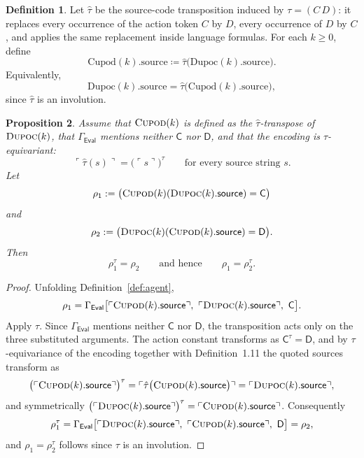 \documentclass[11pt]{article}
\theoremstyle{definition}
\newtheorem{definition}{Definition}[section]
\theoremstyle{plain}
\newtheorem{proposition}[definition]{Proposition}
\theoremstyle{remark}
\begin{document}
\newpage

\begin{definition}\label{def:transposed-agents}
Let \(\widehat{\tau}\) be the source-code transposition induced by
\(\tau=(C\,D)\): it replaces every occurrence of the action token \(C\)
by \(D\), every occurrence of \(D\) by \(C\), and applies the same
replacement inside language formulas. For each \(k\geq 0\), define
\[
\mathrm{Cupod}(k).\mathrm{source}
\coloneq
\widehat{\tau}\bigl(\mathrm{Dupoc}(k).\mathrm{source}\bigr).
\]
Equivalently,
\[
\mathrm{Dupoc}(k).\mathrm{source}
=
\widehat{\tau}\bigl(\mathrm{Cupod}(k).\mathrm{source}\bigr),
\]
since \(\widehat{\tau}\) is an involution.
\end{definition}




\begin{proposition}\label{label}
Assume that $\textsc{Cupod}(k)$ is defined as the $\hat{\tau}$-transpose of
$\textsc{Dupoc}(k)$, that $\Gamma_{\mathsf{Eval}}$ mentions neither $\mathsf{C}$ nor
$\mathsf{D}$, and that the encoding is $\tau$-equivariant:
\[
\ulcorner\hat{\tau}(s)\urcorner = \bigl(\ulcorner s\urcorner\bigr)^{\tau}
\qquad\text{for every source string } s.
\]
Let
\[
\rho_1 := \bigl(\textsc{Cupod}(k)(\textsc{Dupoc}(k).\mathsf{source}) = \mathsf{C}\bigr)
\]
and
\[
\rho_2 := \bigl(\textsc{Dupoc}(k)(\textsc{Cupod}(k).\mathsf{source}) = \mathsf{D}\bigr).
\]
Then
\[
\rho_1^{\tau} = \rho_2 \qquad\text{and hence}\qquad \rho_1 = \rho_2^{\tau}.
\]
\end{proposition}









\begin{proof}
Unfolding Definition~\ref{def:agent},
\[
\rho_1 = \Gamma_{\mathsf{Eval}}\bigl[\ulcorner\textsc{Cupod}(k).\mathsf{source}\urcorner,\
\ulcorner\textsc{Dupoc}(k).\mathsf{source}\urcorner,\ \mathsf{C}\bigr].
\]
Apply $\tau$. Since $\Gamma_{\mathsf{Eval}}$ mentions neither $\mathsf{C}$ nor $\mathsf{D}$,
the transposition acts only on the three substituted arguments. The action constant
transforms as $\mathsf{C}^{\tau}=\mathsf{D}$, and by $\tau$-equivariance of the encoding
together with Definition~1.11 the quoted sources transform as
\[
\bigl(\ulcorner\textsc{Cupod}(k).\mathsf{source}\urcorner\bigr)^{\tau}
= \ulcorner\hat{\tau}\bigl(\textsc{Cupod}(k).\mathsf{source}\bigr)\urcorner
= \ulcorner\textsc{Dupoc}(k).\mathsf{source}\urcorner,
\]
and symmetrically $\bigl(\ulcorner\textsc{Dupoc}(k).\mathsf{source}\urcorner\bigr)^{\tau}
= \ulcorner\textsc{Cupod}(k).\mathsf{source}\urcorner$. Consequently
\[
\rho_1^{\tau}
= \Gamma_{\mathsf{Eval}}\bigl[\ulcorner\textsc{Dupoc}(k).\mathsf{source}\urcorner,\
\ulcorner\textsc{Cupod}(k).\mathsf{source}\urcorner,\ \mathsf{D}\bigr]
= \rho_2,
\]
and $\rho_1=\rho_2^{\tau}$ follows since $\tau$ is an involution.
\end{proof}
\end{document}
